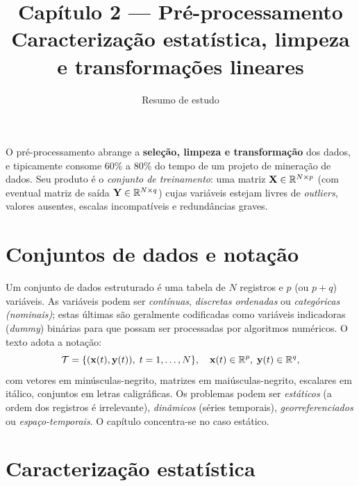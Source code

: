 

\title{\sffamily\bfseries Capítulo 2 — Pré-processamento\\
       \large Caracterização estatística, limpeza e transformações lineares}
\author{Resumo de estudo}
\date{}


\maketitle
\thispagestyle{fancy}

\begin{conceito}
O pré-processamento abrange a \textbf{seleção, limpeza e transformação}
dos dados, e tipicamente consome 60\% a 80\% do tempo de um projeto de
mineração de dados. Seu produto é o \emph{conjunto de treinamento}: uma
matriz $\mathbf{X}\in\mathbb{R}^{N\times p}$ (com eventual matriz de saída
$\mathbf{Y}\in\mathbb{R}^{N\times q}$) cujas variáveis estejam livres de
\emph{outliers}, valores ausentes, escalas incompatíveis e redundâncias
graves.
\end{conceito}

\section{Conjuntos de dados e notação}

Um conjunto de dados estruturado é uma tabela de $N$ registros e $p$ (ou
$p+q$) variáveis. As variáveis podem ser \emph{contínuas},
\emph{discretas ordenadas} ou \emph{categóricas (nominais)}; estas
últimas são geralmente codificadas como variáveis indicadoras
(\emph{dummy}) binárias para que possam ser processadas por algoritmos
numéricos. O texto adota a notação:
\[
\mathcal{T} = \{(\mathbf{x}(t),\mathbf{y}(t)),\; t=1,\dots,N\},\quad
\mathbf{x}(t)\in\mathbb{R}^p,\;\mathbf{y}(t)\in\mathbb{R}^q,
\]
com vetores em minúsculas-negrito, matrizes em maiúsculas-negrito,
escalares em itálico, conjuntos em letras caligráficas. Os problemas
podem ser \emph{estáticos} (a ordem dos registros é irrelevante),
\emph{dinâmicos} (séries temporais), \emph{georreferenciados} ou
\emph{espaço-temporais}. O capítulo concentra-se no caso estático.

\section{Caracterização estatística}

